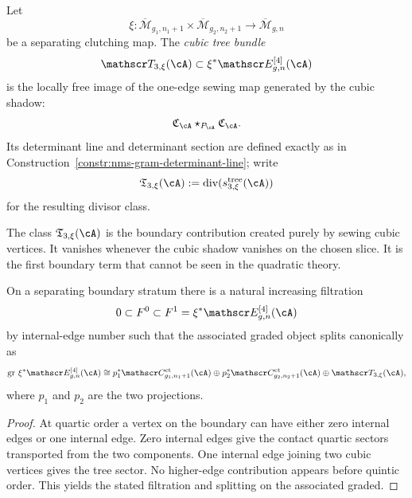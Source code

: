 \begin{definition}
\label{def:nms-cubic-tree-bundle}
Let
\[
\xi\colon \overline{\mathcal M}_{g_1,n_1+1}\times \overline{\mathcal M}_{g_2,n_2+1}
\longrightarrow \overline{\mathcal M}_{g,n}
\]
be a separating clutching map. The \emph{cubic tree bundle}
\[
\mathscr T_{3,\xi}(\cA)
\subset
\xi^*\mathscr E_{g,n}^{[4]}(\cA)
\]
is the locally free image of the one-edge sewing map generated by the cubic shadow:
\[
\mathfrak C_{\cA}\star_{P_{\cA}}\mathfrak C_{\cA}.
\]
Its determinant line and determinant section are defined exactly as in Construction~\ref{constr:nms-gram-determinant-line}; write
\[
\mathfrak T_{3,\xi}(\cA)
:=
\operatorname{div}(s_{3,\xi}^{\mathrm{tree}}(\cA))
\]
for the resulting divisor class.
\end{definition}

\begin{remark}
\label{rem:nms-tree-class-interpretation}
The class $\mathfrak T_{3,\xi}(\cA)$ is the boundary contribution created purely by sewing cubic vertices. It vanishes whenever the cubic shadow vanishes on the chosen slice. It is the first boundary term that cannot be seen in the quadratic theory.
\end{remark}

\begin{theorem}
\label{thm:nms-boundary-filtration-quartic-envelope}
On a separating boundary stratum there is a natural increasing filtration
\[
0\subset F^0\subset F^1=\xi^*\mathscr E_{g,n}^{[4]}(\cA)
\]
by internal-edge number such that the associated graded object splits canonically as
\begin{equation}
\label{eq:nms-associated-graded-boundary}
\operatorname{gr}\,\xi^*\mathscr E_{g,n}^{[4]}(\cA)
\cong
p_1^*\mathscr C_{g_1,n_1+1}^{\mathrm{ct}}(\cA)
\oplus
p_2^*\mathscr C_{g_2,n_2+1}^{\mathrm{ct}}(\cA)
\oplus
\mathscr T_{3,\xi}(\cA),
\end{equation}
where $p_1$ and $p_2$ are the two projections.
\end{theorem}

\begin{proof}
At quartic order a vertex on the boundary can have either zero internal edges or one internal edge. Zero internal edges give the contact quartic sectors transported from the two components. One internal edge joining two cubic vertices gives the tree sector. No higher-edge contribution appears before quintic order. This yields the stated filtration and splitting on the associated graded.\qedhere
\end{proof}

